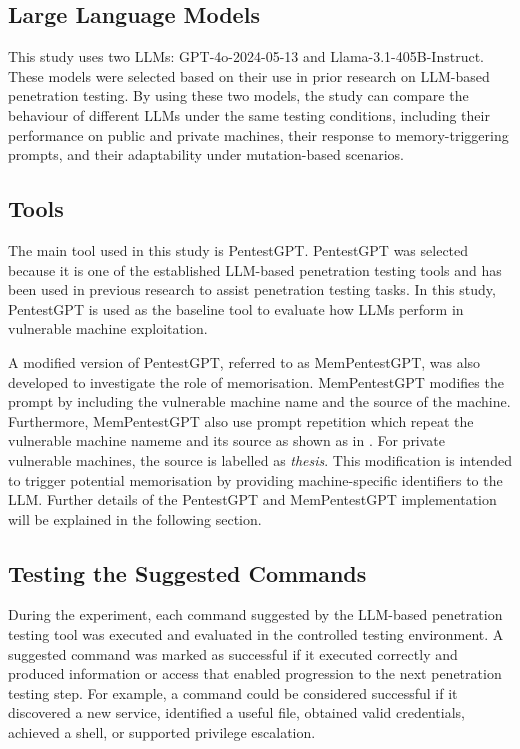\documentclass[acmtog]{acmart}
\begin{document}
\subsection{Large Language Models}

This study uses two LLMs: GPT-4o-2024-05-13 and Llama-3.1-405B-Instruct. These models were selected based on their use in prior research on LLM-based penetration testing. By using these two models, the study can compare the behaviour of different LLMs under the same testing conditions, including their performance on public and private machines, their response to memory-triggering prompts, and their adaptability under mutation-based scenarios.

\subsection{Tools}

The main tool used in this study is PentestGPT. PentestGPT was selected because it is one of the established LLM-based penetration testing tools and has been used in previous research to assist penetration testing tasks. In this study, PentestGPT is used as the baseline tool to evaluate how LLMs perform in vulnerable machine exploitation.

A modified version of PentestGPT, referred to as MemPentestGPT, was also developed to investigate the role of memorisation. MemPentestGPT modifies the prompt by including the vulnerable machine name and the source of the machine. Furthermore, MemPentestGPT also use prompt repetition \cite{leviathan2025prompt} which repeat the vulnerable machine nameme and its source as shown as in . For private vulnerable machines, the source is labelled as \textit{thesis}. This modification is intended to trigger potential memorisation by providing machine-specific identifiers to the LLM. Further details of the PentestGPT and MemPentestGPT implementation will be explained in the following section.

\subsection{Testing the Suggested Commands}

During the experiment, each command suggested by the LLM-based penetration testing tool was executed and evaluated in the controlled testing environment. A suggested command was marked as successful if it executed correctly and produced information or access that enabled progression to the next penetration testing step. For example, a command could be considered successful if it discovered a new service, identified a useful file, obtained valid credentials, achieved a shell, or supported privilege escalation.
\end{document}
